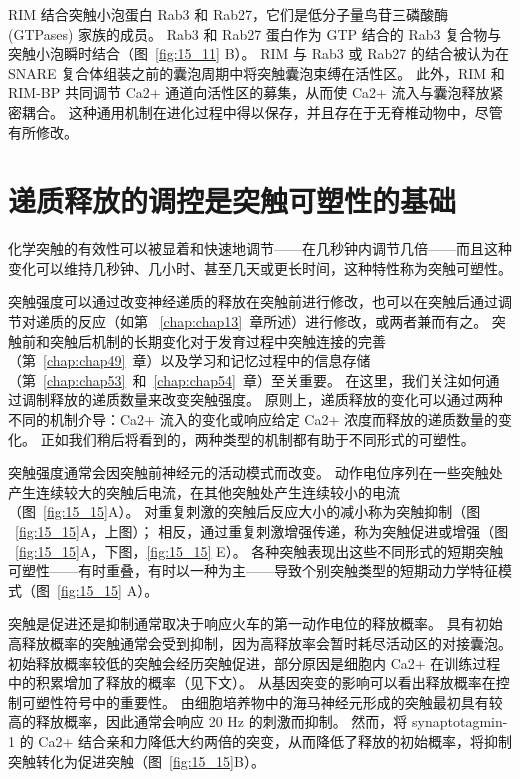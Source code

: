 RIM 结合突触小泡蛋白 Rab3 和 Rab27，它们是低分子量鸟苷三磷酸酶 (GTPases) 家族的成员。
Rab3 和 Rab27 蛋白作为 GTP 结合的 Rab3 复合物与突触小泡瞬时结合（图~\ref{fig:15_11} B）。
RIM 与 Rab3 或 Rab27 的结合被认为在 SNARE 复合体组装之前的囊泡周期中将突触囊泡束缚在活性区。
此外，RIM 和 RIM-BP 共同调节 Ca2+ 通道向活性区的募集，从而使 Ca2+ 流入与囊泡释放紧密耦合。
这种通用机制在进化过程中得以保存，并且存在于无脊椎动物中，尽管有所修改。



\section{递质释放的调控是突触可塑性的基础}

化学突触的有效性可以被显着和快速地调节——在几秒钟内调节几倍——而且这种变化可以维持几秒钟、几小时、甚至几天或更长时间，这种特性称为突触可塑性。


突触强度可以通过改变神经递质的释放在突触前进行修改，也可以在突触后通过调节对递质的反应（如第 ~\ref{chap:chap13}~章所述）进行修改，或两者兼而有之。
突触前和突触后机制的长期变化对于发育过程中突触连接的完善（第~\ref{chap:chap49}~章）以及学习和记忆过程中的信息存储（第~\ref{chap:chap53}~和~\ref{chap:chap54}~章）至关重要。
在这里，我们关注如何通过调制释放的递质数量来改变突触强度。
原则上，递质释放的变化可以通过两种不同的机制介导：Ca2+ 流入的变化或响应给定 Ca2+ 浓度而释放的递质数量的变化。
正如我们稍后将看到的，两种类型的机制都有助于不同形式的可塑性。


突触强度通常会因突触前神经元的活动模式而改变。
动作电位序列在一些突触处产生连续较大的突触后电流，在其他突触处产生连续较小的电流（图~\ref{fig:15_15}A）。
对重复刺激的突触后反应大小的减小称为突触抑制（图 ~\ref{fig:15_15}A，上图）；
相反，通过重复刺激增强传递，称为突触促进或增强（图 ~\ref{fig:15_15}A，下图，\ref{fig:15_15} E）。
各种突触表现出这些不同形式的短期突触可塑性——有时重叠，有时以一种为主——导致个别突触类型的短期动力学特征模式（图~\ref{fig:15_15} A）。


突触是促进还是抑制通常取决于响应火车的第一动作电位的释放概率。
具有初始高释放概率的突触通常会受到抑制，因为高释放率会暂时耗尽活动区的对接囊泡。
初始释放概率较低的突触会经历突触促进，部分原因是细胞内 Ca2+ 在训练过程中的积累增加了释放的概率（见下文）。
从基因突变的影响可以看出释放概率在控制可塑性符号中的重要性。
由细胞培养物中的海马神经元形成的突触最初具有较高的释放概率，因此通常会响应 20 Hz 的刺激而抑制。
然而，将 synaptotagmin-1 的 Ca2+ 结合亲和力降低大约两倍的突变，从而降低了释放的初始概率，将抑制突触转化为促进突触（图~\ref{fig:15_15}B）。



